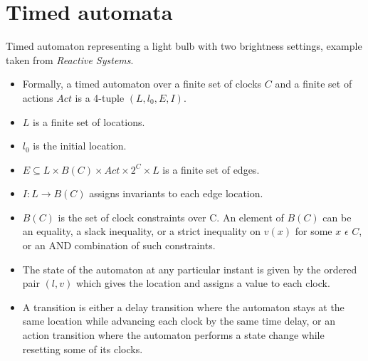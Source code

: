\documentclass{article}
\begin{document}
  \section{Timed automata}

  
  Timed automaton representing a light bulb with two
  brightness settings, example taken from \textit{Reactive Systems}.

  \begin{itemize}
  \item Formally, a timed automaton over a finite set of clocks $C$
    and a finite set of actions $Act$ is a 4-tuple $(L, l_{0}, E, I)$.
  \item $L$ is a finite set of locations.
  \item $l_{0}$ is the initial location.
  \item $E \subseteq L \times B(C) \times Act \times 2^{C} \times L$
    is a finite set of edges.
  \item $I: L \rightarrow B(C)$ assigns invariants to each edge
    location.
  \item $B(C)$ is the set of clock constraints over C. An element of $B(C)$
    can be an equality, a slack inequality, or a strict inequality on
    $v(x)$ for some $x$ $\epsilon$ $C$, or
    an AND combination of such constraints.
  \item The state of the automaton at any particular instant is given
    by the ordered pair $(l, v)$ which gives the location and assigns
    a value to each clock. 
  \item A transition is either a delay transition where the automaton
    stays at the same location while advancing each clock by the same
    time delay, or an action transition where the automaton performs a
    state change while resetting some of its clocks.
  \end{itemize}
  
\end{document}
